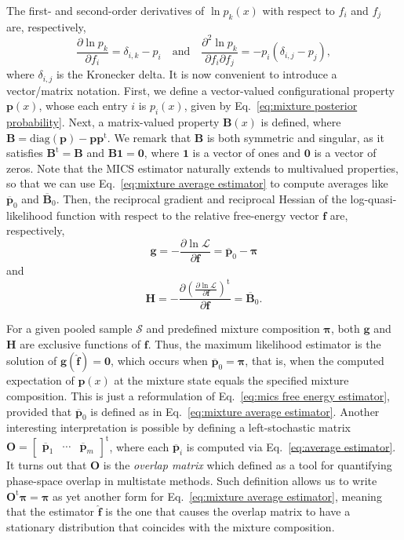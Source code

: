 \documentclass[
    journal=jctcce,
    layout=twocolumn
]{achemso}
\newcommand{\mt}[1]{\boldsymbol{\mathbf{#1}}}   %
\newcommand{\vt}[1]{\boldsymbol{\mathbf{#1}}}   %
\newcommand{\tr}[1]{#1^\text{t}}                %
\newcommand{\diff}[2]{\frac{\partial #2}{\partial #1}} %
\newcommand{\avg}[1]{\overline{#1}}             %
\begin{document}
The first- and second-order derivatives of $\ln p_k(x)$ with respect to $f_i$ and $f_j$ are, respectively,
\begin{equation*}
\frac{\partial \ln p_k}{\partial f_i} = \delta_{i,k} - p_i
\quad \text{and} \quad
\frac{\partial^2\ln p_k}{\partial f_i \partial f_j} = -p_i(\delta_{i,j} - p_j),
\end{equation*}
where $\delta_{i,j}$ is the Kronecker delta. It is now convenient to introduce a vector/matrix notation. First, we define a vector-valued configurational property $\vt p(x)$, whose each entry $i$ is $p_i(x)$, given by Eq.~\eqref{eq:mixture posterior probability}. Next, a matrix-valued property $\mt B(x)$ is defined, where $\mt B = \text{diag}(\vt p) - {\vt p}\tr{\vt p}$. We remark that $\mt B$ is both symmetric and singular, as it satisfies $\tr{\mt B} = \mt B$ and $\mt B\vt 1 = \vt 0$, where $\vt 1$ is a vector of ones and $\vt 0$ is a vector of zeros. Note that the MICS estimator naturally extends to multivalued properties, so that we can use Eq.~\eqref{eq:mixture average estimator} to compute averages like $\avg{\vt p}_0$ and $\avg{\mt B}_0$. Then, the reciprocal gradient and reciprocal Hessian of the log-quasi-likelihood function with respect to the relative free-energy vector $\vt f$ are, respectively,
\begin{equation}
\label{eq:mics score vector}
\vt g = -\diff{\vt f}{\ln \mathcal L} = \avg{\vt p}_0 - \vt \pi
\end{equation}
and
\begin{equation}
\label{eq:mics fisher information matrix}
\mt H = -\diff{\vt f}{\tr{\left(\diff{\vt f}{\ln \mathcal L}\right)}} = \avg{\mt B}_0.
\end{equation}

For a given pooled sample $\mathcal S$ and predefined mixture composition $\vt \pi$, both $\vt g$ and $\mt H$ are exclusive functions of $\vt f$. Thus, the maximum likelihood estimator is the solution of $\vt g(\hat{\vt f}) = \vt 0$, which occurs when $\avg{\vt p}_0 = \vt \pi$, that is, when the computed expectation of $\vt p(x)$ at the mixture state equals the specified mixture composition. This is just a reformulation of Eq.~\eqref{eq:mics free energy estimator}, provided that $\avg{\vt p}_0$ is defined as in Eq.~\eqref{eq:mixture average estimator}. Another interesting interpretation is possible by defining a left-stochastic matrix $\mt O = \tr{[\begin{array}{ccc} \avg{\vt p}_1 & \cdots & \avg{\vt p}_m \end{array}]}$, where each $\avg{\vt p}_i$ is computed via Eq.~\eqref{eq:average estimator}. It turns out that $\mt O$ is the \textit{overlap matrix} which \citeauthor{Klimovich_2015} \cite{Klimovich_2015} defined as a tool for quantifying phase-space overlap in multistate methods. Such definition allows us to write $\tr{\mt O} \vt \pi = \vt \pi$ as yet another form for Eq.~\eqref{eq:mixture average estimator}, meaning that the estimator $\hat{\vt f}$ is the one that causes the overlap matrix to have a stationary distribution that coincides with the mixture composition.
\end{document}
